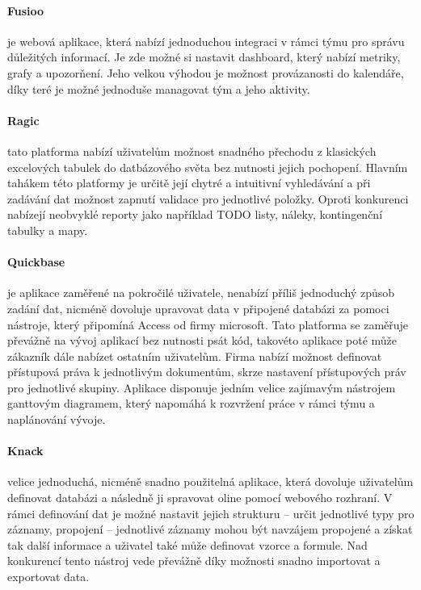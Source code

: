 \paragraph{Fusioo} je webová aplikace, která nabízí jednoduchou integraci v rámci týmu pro správu důležitých informací. Je zde možné si nastavit dashboard, který nabízí metriky, grafy a upozorňení. Jeho velkou výhodou je možnost provázanosti do kalendáře, díky teré je možné jednoduše managovat tým a jeho aktivity.

\paragraph{Ragic} tato platforma nabízí uživatelům možnost snadného přechodu z klasických excelových tabulek do datbázového světa bez nutnosti jejich pochopení. Hlavním tahákem této platformy je určitě její chytré a intuitivní vyhledávání a při zadávání dat možnost zapnutí validace pro jednotlivé položky. Oproti konkurenci nabízejí neobvyklé reporty jako například TODO listy, náleky, kontingenční tabulky a mapy.

\paragraph{Quickbase} je aplikace zaměřené na pokročilé uživatele, nenabízí příliš jednoduchý způsob zadání dat, nicméně dovoluje upravovat data v připojené databázi za pomoci nástroje, který připomíná Access od firmy microsoft. Tato platforma se zaměřuje převážně na vývoj aplikací bez nutnosti psát kód, takovéto aplikace poté může zákazník dále nabízet ostatním uživatelům. Firma nabízí možnost definovat přístupová práva k jednotlivým dokumentům, skrze nastavení přístupových práv pro jednotlivé skupiny. Aplikace disponuje jedním velice zajímavým nástrojem ganttovým diagramem, který napomáhá k rozvržení práce v rámci týmu a naplánování vývoje.

\paragraph{Knack} velice jednoduchá, nicméně snadno použitelná aplikace, která dovoluje uživatelům definovat databázi a následně ji spravovat oline pomocí webového rozhraní. V rámci definování dat je možné nastavit jejich strukturu -- určit jednotlivé typy pro záznamy, propojení -- jednotlivé záznamy mohou být navzájem propojené a získat tak další informace a uživatel také může definovat vzorce a formule. Nad konkurencí tento nástroj vede převážně díky možnosti snadno importovat a exportovat data.

